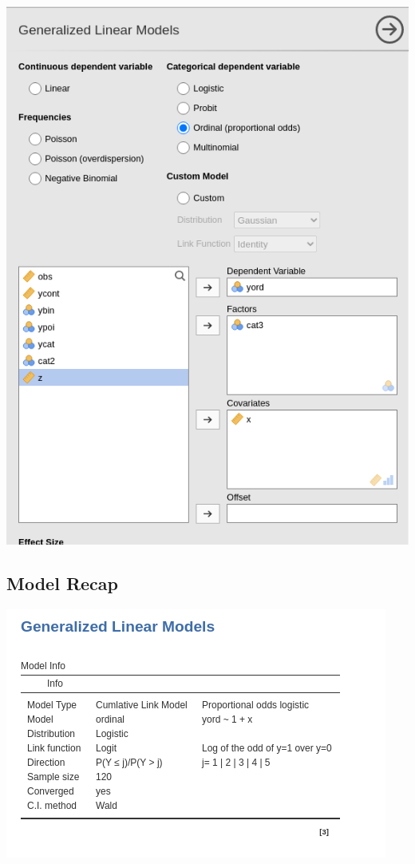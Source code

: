 \documentclass[
]{book}
\begin{document}
\includegraphics{bookletpics/3_ordinal_input1.png}

\hypertarget{model-recap-2}{%
\subsection{Model Recap}\label{model-recap-2}}

\includegraphics{bookletpics/3_ordinal_output1.png}
\end{document}
